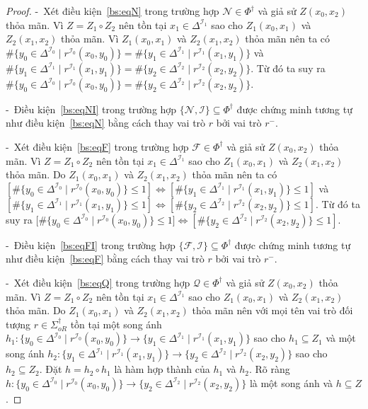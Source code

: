 \documentclass[12pt,a4paper,twoside]{report}
\newcommand{\mI}		{\mathcal{I}}
\newcommand{\mN}		{\mathcal{N}}
\newcommand{\mQ}		{\mathcal{Q}}
\newcommand{\mF}		{\mathcal{F}}
\newcommand{\SigmaDagOR}{\Sigma^\dag_{oR}}
\newcommand{\PhiDag}	{\Phi^\dag}
\newcommand{\semiItem}	{\mbox{- }}
\renewcommand{\sharp}		{\#}
\theoremstyle{definition}
\begin{document}
\begin{proof}
\semiItem Xét điều kiện~\eqref{bs:eqN} trong trường hợp $\mN \in \PhiDag$ và giả sử $Z(x_0, x_2)$ thỏa mãn. Vì $Z = Z_1 \circ Z_2$ nên tồn tại $x_1 \in \Delta^{\mI_1}$ sao cho  $Z_1(x_0,x_1)$ và $Z_2(x_1, x_2)$ thỏa mãn. Vì $Z_1(x_0,x_1)$ và $Z_2(x_1, x_2)$ thỏa mãn nên ta có $\sharp\{y_0 \in \Delta^{\mI_0} \mid r^{\mI_0}(x_0,y_0)\} = \sharp\{y_1 \in \Delta^{\mI_1} \mid r^{\mI_1}(x_1,y_1)\}$ và $\sharp\{y_1 \in \Delta^{\mI_1} \mid r^{\mI_1}(x_1,y_1)\} = \sharp\{y_2 \in \Delta^{\mI_2} \mid r^{\mI_2}(x_2,y_2)\}$. Từ đó ta suy ra $\sharp\{y_0 \in \Delta^{\mI_0} \mid r^{\mI_0}(x_0,y_0)\} = \sharp\{y_2 \in \Delta^{\mI_2} \mid r^{\mI_2}(x_2,y_2)\}$.

\semiItem Điều kiện~\eqref{bs:eqNI} trong trường hợp $\{\mN, \mI\} \subseteq \PhiDag$ được chứng minh tương tự như điều kiện~\eqref{bs:eqN} bằng cách thay vai trò $r$ bởi vai trò $r^-$.

\semiItem Xét điều kiện~\eqref{bs:eqF} trong trường hợp $\mF \in \PhiDag$ và giả sử $Z(x_0, x_2)$ thỏa mãn. Vì $Z = Z_1 \circ Z_2$ nên tồn tại $x_1 \in \Delta^{\mI_1}$ sao cho  $Z_1(x_0,x_1)$ và $Z_2(x_1, x_2)$ thỏa mãn. Do $Z_1(x_0,x_1)$ và $Z_2(x_1, x_2)$ thỏa mãn nên ta có $[\sharp\{y_0 \in \Delta^{\mI_0} \mid r^{\mI_0}(x_0,y_0)\} \leq 1] \Leftrightarrow [\sharp\{y_1 \in \Delta^{\mI_1} \mid r^{\mI_1}(x_1,y_1)\} \leq 1]$ và $[\sharp\{y_1 \in \Delta^{\mI_1} \mid r^{\mI_1}(x_1,y_1)\} \leq 1] \Leftrightarrow [\sharp\{y_2 \in \Delta^{\mI_2} \mid r^{\mI_2}(x_2,y_2)\} \leq 1]$. Từ đó ta suy ra [$\sharp\{y_0 \in \Delta^{\mI_0} \mid r^{\mI_0}(x_0,y_0)\} \leq 1] \Leftrightarrow [\sharp\{y_2 \in \Delta^{\mI_2} \mid r^{\mI_2}(x_2,y_2)\} \leq 1]$.

\semiItem Điều kiện~\eqref{bs:eqFI} trong trường hợp $\{\mF, \mI\} \subseteq \PhiDag$ được chứng minh tương tự như điều kiện~\eqref{bs:eqF} bằng cách thay vai trò $r$ bởi vai trò $r^-$.

\semiItem Xét điều kiện~\eqref{bs:eqQ} trong trường hợp $\mQ \in \PhiDag$ và giả sử $Z(x_0, x_2)$ thỏa mãn. Vì $Z = Z_1 \circ Z_2$ nên tồn tại $x_1 \in \Delta^{\mI_1}$ sao cho  $Z_1(x_0,x_1)$ và $Z_2(x_1, x_2)$ thỏa mãn. Do $Z_1(x_0,x_1)$ và $Z_2(x_1, x_2)$ thỏa mãn nên với mọi tên vai trò đối tượng $r \in \SigmaDagOR$ tồn tại một song ánh $h_1 : \{y_0 \in \Delta^{\mI_0} \mid r^{\mI_0}(x_0,y_0)\} \rightarrow \{y_1 \in \Delta^{\mI_1} \mid r^{\mI_1}(x_1,y_1)\}$ sao cho $h_1 \subseteq Z_1$  và một song ánh $h_2 : \{y_1 \in \Delta^{\mI_1} \mid r^{\mI_1}(x_1,y_1)\} \rightarrow \{y_2 \in \Delta^{\mI_2} \mid r^{\mI_2}(x_2,y_2)\}$ sao cho $h_2 \subseteq Z_2$. 
Đặt $h = h_2 \circ h_1$ là hàm hợp thành của $h_1$ và $h_2$. Rõ ràng $h : \{y_0 \in \Delta^{\mI_0} \mid r^{\mI_0}(x_0,y_0)\} \rightarrow \{y_2 \in \Delta^{\mI_2} \mid r^{\mI_2}(x_2,y_2)\}$ là một song ánh và $h \subseteq Z$.


\end{proof}
\end{document}
